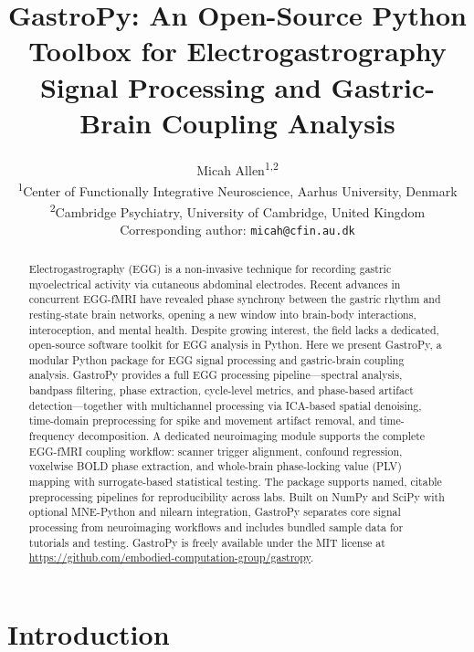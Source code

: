 \documentclass[12pt]{article}
\title{GastroPy: An Open-Source Python Toolbox for Electrogastrography
  Signal Processing and Gastric-Brain Coupling Analysis}
\author{
  Micah Allen\textsuperscript{1,2}\\[1em]
  \small\textsuperscript{1}Center of Functionally Integrative Neuroscience,
    Aarhus University, Denmark\\
  \small\textsuperscript{2}Cambridge Psychiatry,
    University of Cambridge, United Kingdom\\[0.5em]
  \small Corresponding author: \texttt{micah@cfin.au.dk}
}
\date{}
\begin{document}
\maketitle

\begin{abstract}
Electrogastrography (EGG) is a non-invasive technique for recording gastric
myoelectrical activity via cutaneous abdominal electrodes. Recent advances in
concurrent EGG-fMRI have revealed phase synchrony between the gastric rhythm
and resting-state brain networks, opening a new window into brain-body
interactions, interoception, and mental health. Despite growing interest, the
field lacks a dedicated, open-source software toolkit for EGG analysis in
Python. Here we present GastroPy, a modular Python package for EGG signal
processing and gastric-brain coupling analysis. GastroPy provides a full
EGG processing pipeline---spectral analysis, bandpass filtering, phase
extraction, cycle-level metrics, and phase-based artifact
detection---together with multichannel processing via ICA-based spatial
denoising, time-domain preprocessing for spike and movement artifact removal,
and time-frequency decomposition. A dedicated neuroimaging module supports
the complete EGG-fMRI coupling workflow: scanner trigger alignment, confound
regression, voxelwise BOLD phase extraction, and whole-brain phase-locking
value (PLV) mapping with surrogate-based statistical testing. The package
supports named, citable preprocessing pipelines for reproducibility across
labs. Built on NumPy and SciPy with optional MNE-Python and nilearn
\citep{Abraham2014} integration, GastroPy separates core signal processing
from neuroimaging workflows and includes bundled sample data for tutorials
and testing. GastroPy is freely available under the MIT license at
\url{https://github.com/embodied-computation-group/gastropy}.
\end{abstract}

\onehalfspacing

\section{Introduction}
\end{document}
